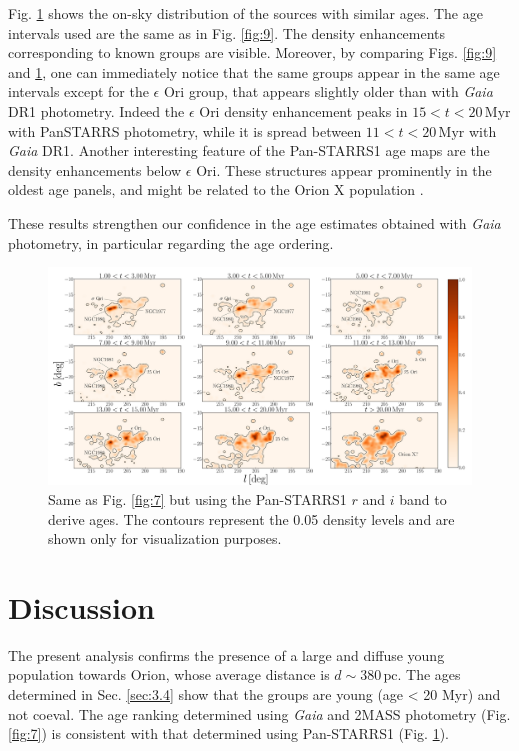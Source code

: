 \documentclass[onecolumn]{aa} %
\begin{document}
Fig. \ref{fig:10} shows the on-sky distribution of the sources with similar ages. The age intervals used are the same as in Fig. \ref{fig:9}. The density enhancements corresponding to known groups are visible. Moreover, by comparing Figs. \ref{fig:9} and \ref{fig:10}, one can immediately notice that the same groups appear in the same age intervals except for  the $\epsilon$ Ori group, that appears slightly older than with \textit{Gaia} DR1 photometry. Indeed the $\epsilon$ Ori density enhancement peaks in $15 < t < 20 \, \mathrm{Myr}$ with PanSTARRS photometry, while it is spread between $11 < t < 20 \, \mathrm{Myr}$ with \textit{Gaia} DR1. 
Another interesting feature of the Pan-STARRS1 age maps are the density enhancements below $\epsilon$ Ori. These structures appear prominently in the oldest age panels, and might be related to the Orion X population \citep{Bouy2015}. 


These results strengthen our confidence in the age estimates obtained with \textit{Gaia} photometry, in particular regarding the age ordering. 

\begin{figure}
\includegraphics[width = \hsize]{fig12.pdf}
\caption{Same as Fig. \ref{fig:7} but using the Pan-STARRS1 $r$ and $i$ band to derive ages. The contours represent the 0.05 density levels and are shown only for visualization purposes.}
\label{fig:10}
\end{figure}


\section{Discussion}
The present analysis confirms the presence of a large and diffuse young population towards Orion, whose average distance is  $d \sim 380 \, \mathrm{pc}$.
The ages determined in Sec. \ref{sec:3.4} show that the groups are young (age < 20 Myr) and not coeval. The age ranking determined using \textit{Gaia} and 2MASS photometry (Fig. \ref{fig:7})  is  consistent with that determined using Pan-STARRS1 (Fig. \ref{fig:10}). 
\end{document}
